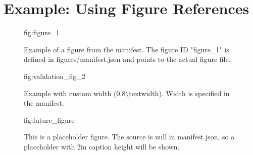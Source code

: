 
\section{Example: Using Figure References}


\begin{figure}[t!]
    \centering
    {{fig:figure_1}}
    \caption{Example of a figure from the manifest. The figure ID "figure\_1" is defined in figures/manifest.json and points to the actual figure file.}
    \label{fig:example-1}
\end{figure}


\begin{figure}[t!]
    \centering
    {{fig:validation_fig_2}}
    \caption{Example with custom width (0.8\textbackslash textwidth). Width is specified in the manifest.}
    \label{fig:example-2}
\end{figure}


\begin{figure}[t!]
    \centering
    {{fig:future_figure}}
    \caption{This is a placeholder figure. The source is null in manifest.json, so a placeholder with 2in caption height will be shown.}
    \label{fig:placeholder}
\end{figure}



